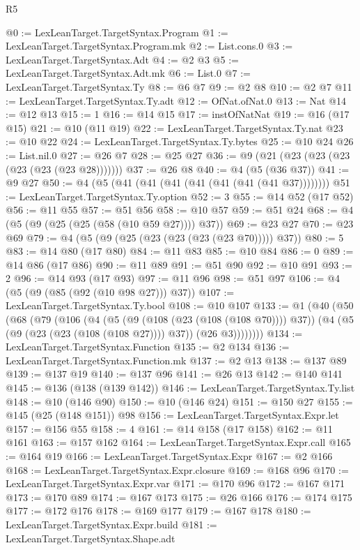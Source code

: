 \begin{lexlean}{R5}
\begin{coremodule}
{{{{{{{{{{{{{{{{{{{{{{{{{{{{{{{{{{{{{{{{{{{{{{{{{{{{{{{{{{{{{{@0 := LexLeanTarget.TargetSyntax.Program
@1 := LexLeanTarget.TargetSyntax.Program.mk
@2 := List.cons.{0}
@3 := LexLeanTarget.TargetSyntax.Adt
@4 := @2 @3
@5 := LexLeanTarget.TargetSyntax.Adt.mk
@6 := List.{0}
@7 := LexLeanTarget.TargetSyntax.Ty
@8 := @6 @7
@9 := @2 @8
@10 := @2 @7
@11 := LexLeanTarget.TargetSyntax.Ty.adt
@12 := OfNat.ofNat.{0}
@13 := Nat
@14 := @12 @13
@15 := 1
@16 := @14 @15
@17 := instOfNatNat
@19 := @16 (@17 @15)
@21 := @10 (@11 @19)
@22 := LexLeanTarget.TargetSyntax.Ty.nat
@23 := @10 @22
@24 := LexLeanTarget.TargetSyntax.Ty.bytes
@25 := @10 @24
@26 := List.nil.{0}
@27 := @26 @7
@28 := @25 @27
@36 := @9 (@21 (@23 (@23 (@23 (@23 (@23 (@23 @28)))))))
@37 := @26 @8
@40 := @4 (@5 (@36 @37))
@41 := @9 @27
@50 := @4 (@5 (@41 (@41 (@41 (@41 (@41 (@41 (@41 @37))))))))
@51 := LexLeanTarget.TargetSyntax.Ty.option
@52 := 3
@55 := @14 @52 (@17 @52)
@56 := @11 @55
@57 := @51 @56
@58 := @10 @57
@59 := @51 @24
@68 := @4 (@5 (@9 (@25 (@25 (@58 (@10 @59 @27)))) @37))
@69 := @23 @27
@70 := @23 @69
@79 := @4 (@5 (@9 (@25 (@23 (@23 (@23 (@23 @70))))) @37))
@80 := 5
@83 := @14 @80 (@17 @80)
@84 := @11 @83
@85 := @10 @84
@86 := 0
@89 := @14 @86 (@17 @86)
@90 := @11 @89
@91 := @51 @90
@92 := @10 @91
@93 := 2
@96 := @14 @93 (@17 @93)
@97 := @11 @96
@98 := @51 @97
@106 := @4 (@5 (@9 (@85 (@92 (@10 @98 @27))) @37))
@107 := LexLeanTarget.TargetSyntax.Ty.bool
@108 := @10 @107
@133 := @1
    (@40
      (@50
        (@68
          (@79
            (@106
              (@4
                (@5 (@9 (@108 (@23 (@108 (@108 @70)))) @37))
                (@4 (@5 (@9 (@23 (@23 (@108 (@108 @27)))) @37)) (@26 @3))))))))
@134 := LexLeanTarget.TargetSyntax.Function
@135 := @2 @134
@136 := LexLeanTarget.TargetSyntax.Function.mk
@137 := @2 @13
@138 := @137 @89
@139 := @137 @19
@140 := @137 @96
@141 := @26 @13
@142 := @140 @141
@145 := @136 (@138 (@139 @142))
@146 := LexLeanTarget.TargetSyntax.Ty.list
@148 := @10 (@146 @90)
@150 := @10 (@146 @24)
@151 := @150 @27
@155 := @145 (@25 (@148 @151)) @98
@156 := LexLeanTarget.TargetSyntax.Expr.let
@157 := @156 @55
@158 := 4
@161 := @14 @158 (@17 @158)
@162 := @11 @161
@163 := @157 @162
@164 := LexLeanTarget.TargetSyntax.Expr.call
@165 := @164 @19
@166 := LexLeanTarget.TargetSyntax.Expr
@167 := @2 @166
@168 := LexLeanTarget.TargetSyntax.Expr.closure
@169 := @168 @96
@170 := LexLeanTarget.TargetSyntax.Expr.var
@171 := @170 @96
@172 := @167 @171
@173 := @170 @89
@174 := @167 @173
@175 := @26 @166
@176 := @174 @175
@177 := @172 @176
@178 := @169 @177
@179 := @167 @178
@180 := LexLeanTarget.TargetSyntax.Expr.build
@181 := LexLeanTarget.TargetSyntax.Shape.adt
}}}}}}}}}}}}}}}}}}}}}}}}}}}}}}}}}}}}}}}}}}}}}}}}}}}}}}}}}}}}}}
\end{coremodule}
\end{lexlean}
